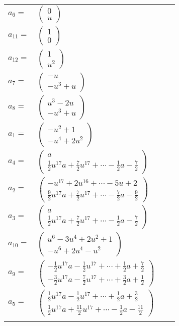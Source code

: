 \documentclass[1p]{elsarticle_modified}
\theoremstyle{definition}
\begin{document}
\begin{tabular}{m{7pt} m{180pt} m{7pt} m{180pt} }
\flushright $a_{6}=$&$\begin{pmatrix}0\\u\end{pmatrix}$ \\
\flushright $a_{11}=$&$\begin{pmatrix}1\\0\end{pmatrix}$ \\
\flushright $a_{12}=$&$\begin{pmatrix}1\\u^2\end{pmatrix}$ \\
\flushright $a_{7}=$&$\begin{pmatrix}- u\\- u^3+u\end{pmatrix}$ \\
\flushright $a_{8}=$&$\begin{pmatrix}u^3-2 u\\- u^3+u\end{pmatrix}$ \\
\flushright $a_{1}=$&$\begin{pmatrix}- u^2+1\\- u^4+2 u^2\end{pmatrix}$ \\
\flushright $a_{4}=$&$\begin{pmatrix}a\\\frac{1}{2} u^{17} a+\frac{7}{2} u^{17}+\cdots-\frac{1}{2} a-\frac{7}{2}\end{pmatrix}$ \\
\flushright $a_{2}=$&$\begin{pmatrix}- u^{17}+2 u^{16}+\cdots-5 u+2\\\frac{9}{2} u^{17} a+\frac{7}{2} u^{17}+\cdots-\frac{7}{2} a-\frac{9}{2}\end{pmatrix}$ \\
\flushright $a_{3}=$&$\begin{pmatrix}a\\\frac{1}{2} u^{17} a+\frac{7}{2} u^{17}+\cdots-\frac{1}{2} a-\frac{7}{2}\end{pmatrix}$ \\
\flushright $a_{10}=$&$\begin{pmatrix}u^6-3 u^4+2 u^2+1\\- u^6+2 u^4- u^2\end{pmatrix}$ \\
\flushright $a_{9}=$&$\begin{pmatrix}-\frac{1}{2} u^{17} a-\frac{1}{2} u^{17}+\cdots+\frac{1}{2} a+\frac{7}{2}\\-\frac{3}{2} u^{17} a-\frac{7}{2} u^{17}+\cdots+\frac{3}{2} a+\frac{1}{2}\end{pmatrix}$ \\
\flushright $a_{5}=$&$\begin{pmatrix}\frac{1}{2} u^{17} a-\frac{1}{2} u^{17}+\cdots+\frac{1}{2} a+\frac{3}{2}\\\frac{1}{2} u^{17} a+\frac{11}{2} u^{17}+\cdots-\frac{1}{2} a-\frac{11}{2}\end{pmatrix}$\\&\end{tabular}
\end{document}
